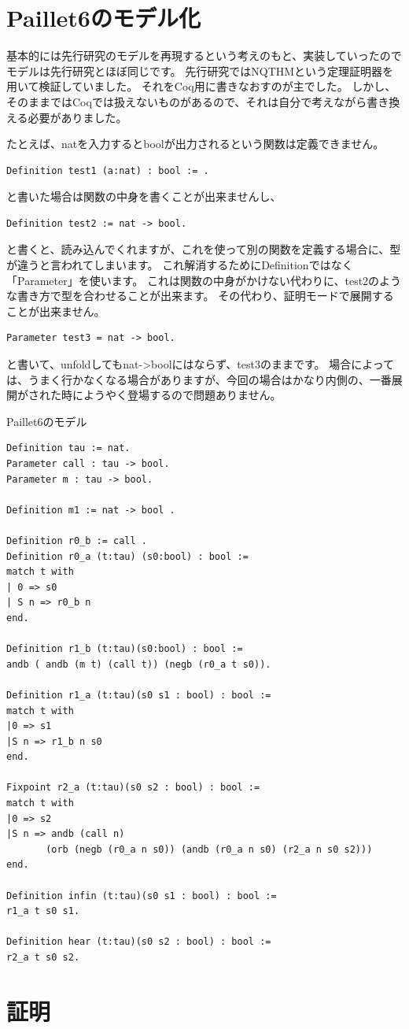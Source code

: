 \documentclass{jsbook}
\begin{document}
\section{Paillet6のモデル化}
基本的には先行研究のモデルを再現するという考えのもと、実装していったのでモデルは先行研究とほぼ同じです。
先行研究ではNQTHMという定理証明器を用いて検証していました。
それをCoq用に書きなおすのが主でした。
しかし、そのままではCoqでは扱えないものがあるので、それは自分で考えながら書き換える必要がありました。

たとえば、natを入力するとboolが出力されるという関数は定義できません。
\begin{verbatim}
Definition test1 (a:nat) : bool := .
\end{verbatim}
と書いた場合は関数の中身を書くことが出来ませんし、
\begin{verbatim}
Definition test2 := nat -> bool.
\end{verbatim}
と書くと、読み込んでくれますが、これを使って別の関数を定義する場合に、型が違うと言われてしまいます。
これ解消するためにDefinitionではなく「Parameter」を使います。
これは関数の中身がかけない代わりに、test2のような書き方で型を合わせることが出来ます。
その代わり、証明モードで展開することが出来ません。
\begin{verbatim}
Parameter test3 = nat -> bool.
\end{verbatim}
と書いて、unfoldしてもnat->boolにはならず、test3のままです。
場合によっては、うまく行かなくなる場合がありますが、今回の場合はかなり内側の、一番展開がされた時にようやく登場するので問題ありません。

\begin{itembox}[l]{Paillet6のモデル}
\begin{verbatim}
Definition tau := nat.
Parameter call : tau -> bool.
Parameter m : tau -> bool.

Definition m1 := nat -> bool .

Definition r0_b := call .
Definition r0_a (t:tau) (s0:bool) : bool :=
match t with
| 0 => s0
| S n => r0_b n
end.

Definition r1_b (t:tau)(s0:bool) : bool :=
andb ( andb (m t) (call t)) (negb (r0_a t s0)).

Definition r1_a (t:tau)(s0 s1 : bool) : bool :=
match t with
|0 => s1
|S n => r1_b n s0
end.

Fixpoint r2_a (t:tau)(s0 s2 : bool) : bool :=
match t with
|0 => s2
|S n => andb (call n) 
       (orb (negb (r0_a n s0)) (andb (r0_a n s0) (r2_a n s0 s2)))
end.

Definition infin (t:tau)(s0 s1 : bool) : bool :=
r1_a t s0 s1.

Definition hear (t:tau)(s0 s2 : bool) : bool :=
r2_a t s0 s2.
\end{verbatim}
\end{itembox}
\section{証明}
\end{document}
